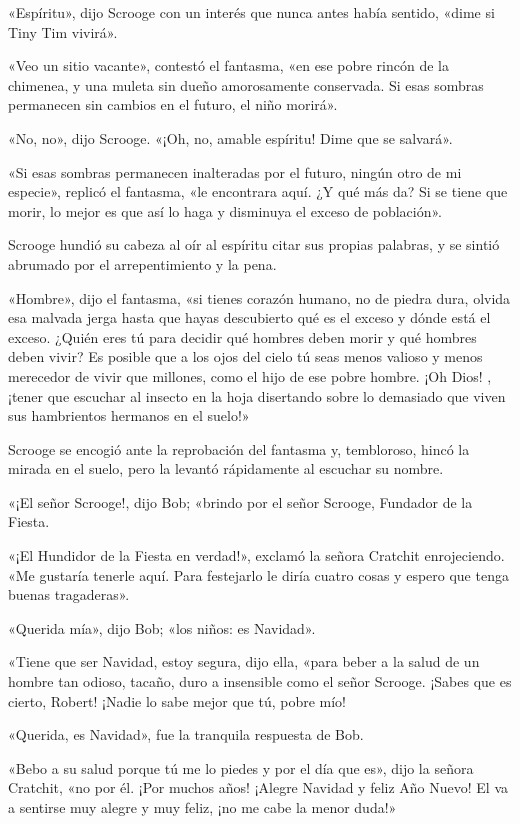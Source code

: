 \documentclass{novela}
\begin{document}
 «Espíritu», dijo Scrooge con un interés que nunca antes había sentido, «dime si Tiny Tim vivirá».

 «Veo un sitio vacante», contestó el fantasma, «en ese pobre rincón de la chimenea, y una muleta sin dueño amorosamente conservada. Si esas sombras permanecen sin cambios en el futuro, el niño morirá».

 «No, no», dijo Scrooge. «¡Oh, no, amable espíritu! Dime que se salvará».

 «Si esas sombras permanecen inalteradas por el futuro, ningún otro de mi especie», replicó el fantasma, «le encontrara aquí. ¿Y qué más da? Si se tiene que morir, lo mejor es que así lo haga y disminuya el exceso de población».

 Scrooge hundió su cabeza al oír al espíritu citar sus propias palabras, y se sintió abrumado por el arrepentimiento y la pena.

 «Hombre», dijo el fantasma, «si tienes corazón humano, no de piedra dura, olvida esa malvada jerga hasta que hayas descubierto qué es el exceso y dónde está el exceso. ¿Quién eres tú para decidir qué hombres deben morir y qué hombres deben vivir? Es posible que a los ojos del cielo tú seas menos valioso y menos merecedor de vivir que millones, como el hijo de ese pobre hombre. ¡Oh Dios! , ¡tener que escuchar al insecto en la hoja disertando sobre lo demasiado que viven sus hambrientos hermanos en el suelo!»

 Scrooge se encogió ante la reprobación del fantasma y, tembloroso, hincó la mirada en el suelo, pero la levantó rápidamente al escuchar su nombre.

 «¡El señor Scrooge!, dijo Bob; «brindo por el señor Scrooge, Fundador de la Fiesta.

 «¡El Hundidor de la Fiesta en verdad!», exclamó la señora Cratchit enrojeciendo. «Me gustaría tenerle aquí. Para festejarlo le diría cuatro cosas y espero que tenga buenas tragaderas».

 «Querida mía», dijo Bob; «los niños: es Navidad».

 «Tiene que ser Navidad, estoy segura, dijo ella, «para beber a la salud de un hombre tan odioso, tacaño, duro a insensible como el señor Scrooge. ¡Sabes que es cierto, Robert! ¡Nadie lo sabe mejor que tú, pobre mío!

 «Querida, es Navidad», fue la tranquila respuesta de Bob.

 «Bebo a su salud porque tú me lo piedes y por el día que es», dijo la señora Cratchit, «no por él. ¡Por muchos años! ¡Alegre Navidad y feliz Año Nuevo! El va a sentirse muy alegre y muy feliz, ¡no me cabe la menor duda!»
\end{document}

